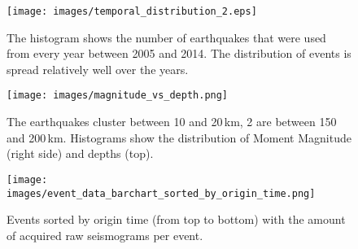 
\begin{figure}[h]
\begin{center}
\texttt{[image: images/temporal\_distribution\_2.eps]}
\caption[Temporal distribution of the earthquakes.]
{The histogram shows the number of earthquakes that were used from every year between 2005 and 2014.
The distribution of events is spread relatively well over the years.}
\label{temp_dist}
\end{center}
\end{figure}

\begin{figure}[h]
\begin{center}
\texttt{[image: images/magnitude\_vs\_depth.png]}
\caption[Depth distribution of the earthquakes.]{The earthquakes cluster between 10 and 20\,km, 
2 are between 150 and 200\,km. 
Histograms show the distribution of Moment Magnitude (right side) and depths (top).}
\label{depth_scatter}
\end{center}
\end{figure}

\begin{figure}[h]
\begin{center}
\texttt{[image: images/event\_data\_barchart\_sorted\_by\_origin\_time.png]}
\caption[Raw seismograms per event]{Events sorted by origin time (from top to bottom) with the amount 
of acquired raw seismograms per event.}
\label{event_data}
\end{center}
\end{figure}



